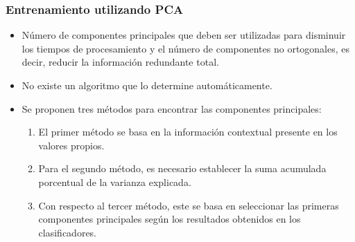 \documentclass[mathserif]{beamer}
\begin{document}
\begin{frame}
\frametitle{Entrenamiento utilizando PCA}

\begin{itemize}
\item Número de componentes principales que deben ser utilizadas para disminuir los tiempos de procesamiento y el número de componentes no ortogonales, es decir, reducir la información redundante total.
\pause
\item No existe un algoritmo que lo determine automáticamente.
\pause
\item Se proponen tres métodos para encontrar las componentes principales:

\begin{enumerate}[1]
\pause
	\item El primer método se basa en la información contextual presente en los valores propios.
	\pause
	\item Para el segundo método, es necesario establecer la suma acumulada porcentual de la varianza explicada.
	\pause
	\item Con respecto al tercer método, este se basa en seleccionar las primeras componentes principales según los resultados obtenidos en los clasificadores.
\end{enumerate}
\end{itemize}

\end{frame}
\end{document}
